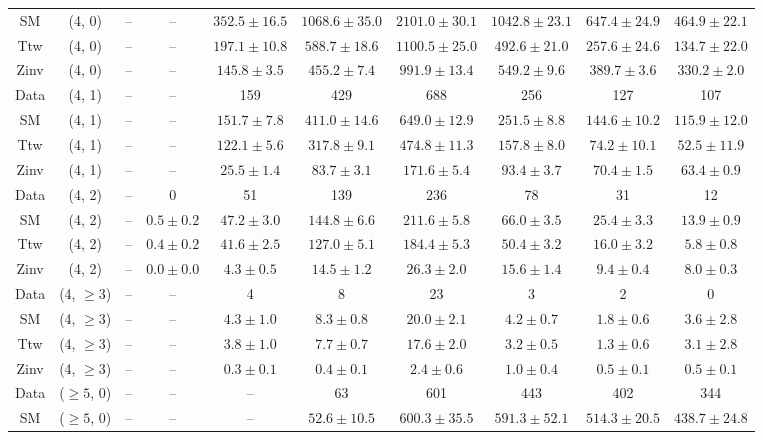 \begin{table}[h!]
{\begin{tabular}{cccccccccc}
	SM & (4, 0) & -- & -- & $352.5\pm 16.5$ & $1068.6\pm 35.0$ & $2101.0\pm 30.1$ & $1042.8\pm 23.1$ & $647.4\pm 24.9$ & $464.9\pm 22.1$ \\[0.5ex] 
	Ttw & (4, 0) & -- & -- & $197.1\pm 10.8$ & $588.7\pm 18.6$ & $1100.5\pm 25.0$ & $492.6\pm 21.0$ & $257.6\pm 24.6$ & $134.7\pm 22.0$ \\[0.5ex] 
	Zinv & (4, 0) & -- & -- & $145.8\pm 3.5$ & $455.2\pm 7.4$ & $991.9\pm 13.4$ & $549.2\pm 9.6$ & $389.7\pm 3.6$ & $330.2\pm 2.0$ \\[0.5ex] 
	Data & (4, 1) & -- & -- & 159 & 429 & 688 & 256 & 127 & 107 \\[0.5ex] 
	SM & (4, 1) & -- & -- & $151.7\pm 7.8$ & $411.0\pm 14.6$ & $649.0\pm 12.9$ & $251.5\pm 8.8$ & $144.6\pm 10.2$ & $115.9\pm 12.0$ \\[0.5ex] 
	Ttw & (4, 1) & -- & -- & $122.1\pm 5.6$ & $317.8\pm 9.1$ & $474.8\pm 11.3$ & $157.8\pm 8.0$ & $74.2\pm 10.1$ & $52.5\pm 11.9$ \\[0.5ex] 
	Zinv & (4, 1) & -- & -- & $25.5\pm 1.4$ & $83.7\pm 3.1$ & $171.6\pm 5.4$ & $93.4\pm 3.7$ & $70.4\pm 1.5$ & $63.4\pm 0.9$ \\[0.5ex] 
	Data & (4, 2) & -- & 0 & 51 & 139 & 236 & 78 & 31 & 12 \\[0.5ex] 
	SM & (4, 2) & -- & $0.5\pm 0.2$ & $47.2\pm 3.0$ & $144.8\pm 6.6$ & $211.6\pm 5.8$ & $66.0\pm 3.5$ & $25.4\pm 3.3$ & $13.9\pm 0.9$ \\[0.5ex] 
	Ttw & (4, 2) & -- & $0.4\pm 0.2$ & $41.6\pm 2.5$ & $127.0\pm 5.1$ & $184.4\pm 5.3$ & $50.4\pm 3.2$ & $16.0\pm 3.2$ & $5.8\pm 0.8$ \\[0.5ex] 
	Zinv & (4, 2) & -- & $0.0\pm 0.0$ & $4.3\pm 0.5$ & $14.5\pm 1.2$ & $26.3\pm 2.0$ & $15.6\pm 1.4$ & $9.4\pm 0.4$ & $8.0\pm 0.3$ \\[0.5ex] 
	Data & (4, $\ge3$) & -- & -- & 4 & 8 & 23 & 3 & 2 & 0 \\[0.5ex] 
	SM & (4, $\ge3$) & -- & -- & $4.3\pm 1.0$ & $8.3\pm 0.8$ & $20.0\pm 2.1$ & $4.2\pm 0.7$ & $1.8\pm 0.6$ & $3.6\pm 2.8$ \\[0.5ex] 
	Ttw & (4, $\ge3$) & -- & -- & $3.8\pm 1.0$ & $7.7\pm 0.7$ & $17.6\pm 2.0$ & $3.2\pm 0.5$ & $1.3\pm 0.6$ & $3.1\pm 2.8$ \\[0.5ex] 
	Zinv & (4, $\ge3$) & -- & -- & $0.3\pm 0.1$ & $0.4\pm 0.1$ & $2.4\pm 0.6$ & $1.0\pm 0.4$ & $0.5\pm 0.1$ & $0.5\pm 0.1$ \\[0.5ex] 
	Data & ($\ge5$, 0) & -- & -- & -- & 63 & 601 & 443 & 402 & 344 \\[0.5ex] 
	SM & ($\ge5$, 0) & -- & -- & -- & $52.6\pm 10.5$ & $600.3\pm 35.5$ & $591.3\pm 52.1$ & $514.3\pm 20.5$ & $438.7\pm 24.8$ \\[0.5ex] 

\end{tabular}}
\end{table}
